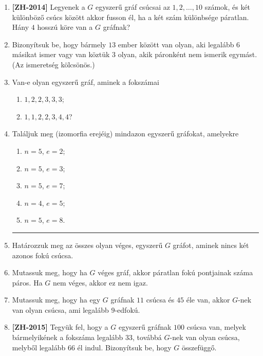 \documentclass[a4paper,12pt]{article}
\begin{document}
\begin{enumerate}
        \item \textbf{[ZH-2014]} Legyenek a $G$ egyszerű gráf csúcsai az $1,2,\ldots,10$ számok, és két különböző csúcs között akkor fusson él, ha a két szám különbsége páratlan. Hány $4$ hosszú köre van a $G$ gráfnak?
        
        \item Bizonyítsuk be, hogy bármely $13$ ember között van olyan, aki legalább $6$ másikat ismer vagy van köztük $3$ olyan, akik páronként nem ismerik egymást. (Az ismeretség kölcsönös.)


        \item Van-e olyan egyszerű gráf, aminek a fokszámai
        \begin{enumerate}
            \item $1,2,2,3,3,3$;
            \item $1,1,2,2,3,4,4$?
        \end{enumerate}

        \item Találjuk meg (izomorfia erejéig) mindazon egyszerű gráfokat, amelyekre
        \begin{multicols}{3}
        \begin{enumerate}
            \item $n=5$, $e=2$;
            \item $n=5$, $e=3$;
            \item $n=5$, $e=7$;
            \item $n=4$, $e=5$;
            \item $n=5$, $e=8$.
        \end{enumerate}
        \end{multicols}


        \hrule

        

        \item Határozzuk meg az összes olyan véges, egyszerű $G$ gráfot, aminek nincs két azonos fokú csúcsa.
        
        \item Mutassuk meg, hogy ha $G$ véges gráf, akkor páratlan fokú pontjainak száma páros. Ha $G$ nem véges, akkor ez nem igaz.
        
        \item Mutassuk meg, hogy ha egy $G$ gráfnak $11$ csúcsa és $45$ éle van, akkor $G$-nek van olyan csúcsa, ami legalább $9$-edfokú.
        
        \item \textbf{[ZH-2015]} Tegyük fel, hogy a $G$ egyszerű gráfnak $100$ csúcsa van, melyek bármelyikének a fokszáma legalább $33$, továbbá $G$-nek van olyan csúcsa, melyből legalább $66$ él indul. Bizonyítsuk be, hogy $G$ összefüggő.
        

\end{enumerate}
\end{document}
